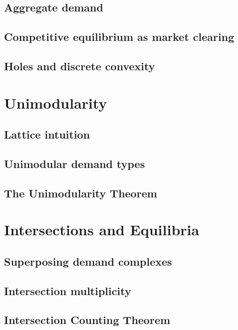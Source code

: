 \documentclass[../../main.tex]{subfiles}
\begin{document}
\subsection{Aggregate demand}
\subsection{Competitive equilibrium as market clearing}
\subsection{Holes and discrete convexity}

\section{Unimodularity}

\subsection{Lattice intuition}
\subsection{Unimodular demand types}
\subsection{The Unimodularity Theorem}

\section{Intersections and Equilibria}

\subsection{Superposing demand complexes}
\subsection{Intersection multiplicity}
\subsection{Intersection Counting Theorem}
\end{document}
